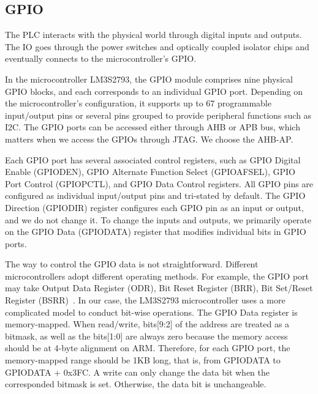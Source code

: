 



\subsection{GPIO}
The PLC interacts with the physical world through digital inputs and outputs. The IO goes through the power switches and optically coupled isolator chips and eventually connects to the microcontroller's GPIO.


In the microcontroller LM3S2793, the GPIO module comprises nine physical GPIO blocks, and each corresponds to an individual GPIO port. Depending on the microcontroller's configuration, it supports up to 67 programmable input/output pins or several pins grouped to provide peripheral functions such as I2C. The GPIO ports can be accessed either through AHB or APB bus, which matters when we access the GPIOs through JTAG. We choose the AHB-AP.

Each GPIO port has several associated control registers, such as GPIO Digital Enable (GPIODEN), GPIO Alternate Function Select (GPIOAFSEL), GPIO Port Control (GPIOPCTL), and GPIO Data Control registers. All GPIO pins are configured as individual input/output pins and tri-stated by default. The GPIO Direction (GPIODIR) register configures each GPIO pin as an input or output, and we do not change it. To change the inputs and outputs, we primarily operate on the GPIO Data (GPIODATA) register that modifies individual bits in GPIO ports. 

The way to control the GPIO data is not straightforward.  Different microcontrollers adopt different operating methods. For example, the GPIO port may take Output Data Register (ODR), Bit Reset Register (BRR), Bit Set/Reset Register (BSRR)~\cite{cottle2001programmable}. In our case, the LM3S2793 microcontroller uses a more complicated model to conduct bit-wise operations. The GPIO Data register is memory-mapped. When read/write, bits[9:2] of the address are treated as a bitmask, as well as the bits[1:0] are always zero because the memory access should be at 4-byte alignment on ARM. Therefore, for each GPIO port, the memory-mapped range should be 1KB long, that is, from GPIODATA to GPIODATA + 0x3FC. A write can only change the data bit when the corresponded bitmask is set. Otherwise, the data bit is unchangeable.

